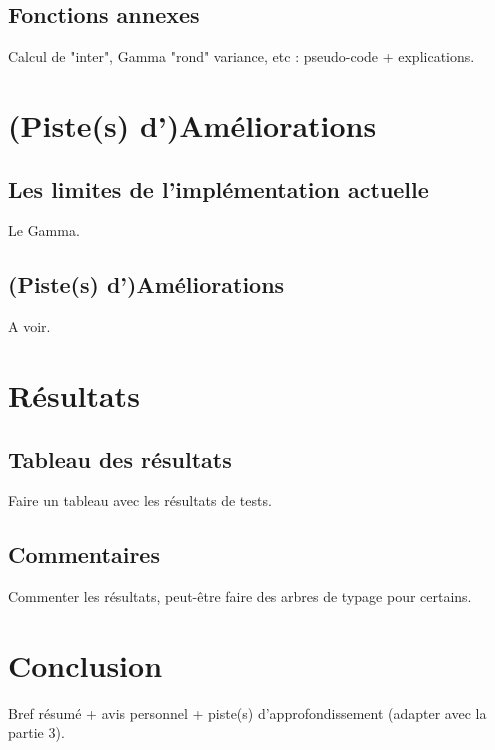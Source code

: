 \documentclass[11pt,a4paper]{article}
\begin{document}
\subsection{Fonctions annexes}

Calcul de "inter", Gamma "rond" variance, etc : pseudo-code + explications.

\section{(Piste(s) d')Améliorations}

\subsection{Les limites de l'implémentation actuelle}

Le Gamma. 

\subsection{(Piste(s) d')Améliorations}

A voir.

\section{Résultats}

\subsection{Tableau des résultats}

Faire un tableau avec les résultats de tests.

\subsection{Commentaires}

Commenter les résultats, peut-être faire des arbres de typage pour certains.

\section*{Conclusion}

Bref résumé + avis personnel + piste(s) d'approfondissement (adapter avec la partie 3).




\end{document}
